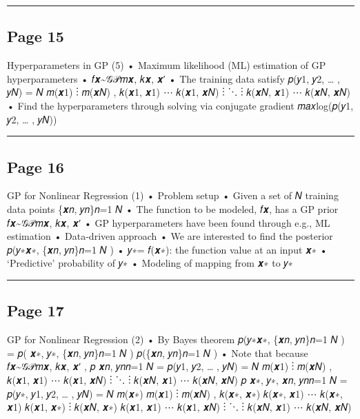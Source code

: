 \documentclass[
]{article}
\begin{document}
\begin{center}\rule{0.5\linewidth}{0.5pt}\end{center}

\subsection{Page 15}\label{page-15}

Hyperparameters in GP (5) • Maximum likelihood (ML) estimation of GP
hyperparameters • 𝑓𝒙\textasciitilde 𝒢𝒫𝑚𝒙, 𝑘𝒙, 𝒙′ • The training data
satisfy 𝑝(𝑦1, 𝑦2, \ldots{} , 𝑦𝑁) = 𝑁 𝑚(𝒙1) ⋮ 𝑚(𝒙𝑁) , 𝑘(𝒙1, 𝒙1) ⋯ 𝑘(𝒙1,
𝒙𝑁) ⋮ ⋱ ⋮ 𝑘(𝒙𝑁, 𝒙1) ⋯ 𝑘(𝒙𝑁, 𝒙𝑁) • Find the hyperparameters through
solving via conjugate gradient 𝑚𝑎𝑥log(𝑝(𝑦1, 𝑦2, \ldots{} , 𝑦𝑁))

\begin{center}\rule{0.5\linewidth}{0.5pt}\end{center}

\subsection{Page 16}\label{page-16}

GP for Nonlinear Regression (1) • Problem setup • Given a set of 𝑁
training data points \{𝒙𝑛, 𝑦𝑛\}𝑛=1 𝑁 • The function to be modeled, 𝑓𝒙,
has a GP prior 𝑓𝒙\textasciitilde 𝒢𝒫𝑚𝒙, 𝑘𝒙, 𝒙′ • GP hyperparameters have
been found through e.g., ML estimation • Data-driven approach • We are
interested to find the posterior 𝑝(𝑦∗\textbar 𝒙∗, \{𝒙𝑛, 𝑦𝑛\}𝑛=1 𝑁 ) •
𝑦∗= 𝑓(𝒙∗): the function value at an input 𝒙∗ • `Predictive' probability
of 𝑦∗ • Modeling of mapping from 𝒙∗ to 𝑦∗

\begin{center}\rule{0.5\linewidth}{0.5pt}\end{center}

\subsection{Page 17}\label{page-17}

GP for Nonlinear Regression (2) • By Bayes theorem 𝑝(𝑦∗\textbar 𝒙∗,
\{𝒙𝑛, 𝑦𝑛\}𝑛=1 𝑁 ) = 𝑝( 𝒙∗, 𝑦∗, \{𝒙𝑛, 𝑦𝑛\}𝑛=1 𝑁 ) 𝑝(\{𝒙𝑛, 𝑦𝑛\}𝑛=1 𝑁 ) •
Note that because 𝑓𝒙\textasciitilde 𝒢𝒫𝑚𝒙, 𝑘𝒙, 𝒙′ , 𝑝 𝒙𝑛, 𝑦𝑛𝑛=1 𝑁 = 𝑝(𝑦1,
𝑦2, \ldots{} , 𝑦𝑁) = 𝑁 𝑚(𝒙1) ⋮ 𝑚(𝒙𝑁) , 𝑘(𝒙1, 𝒙1) ⋯ 𝑘(𝒙1, 𝒙𝑁) ⋮ ⋱ ⋮ 𝑘(𝒙𝑁,
𝒙1) ⋯ 𝑘(𝒙𝑁, 𝒙𝑁) 𝑝 𝒙∗, 𝑦∗, 𝒙𝑛, 𝑦𝑛𝑛=1 𝑁 = 𝑝(𝑦∗, 𝑦1, 𝑦2, \ldots{} , 𝑦𝑁) = 𝑁
𝑚(𝒙∗) 𝑚(𝒙1) ⋮ 𝑚(𝒙𝑁) , 𝑘(𝒙∗, 𝒙∗) 𝑘(𝒙∗, 𝒙1) ⋯ 𝑘(𝒙∗, 𝒙1) 𝑘(𝒙1, 𝒙∗) ⋮ 𝑘(𝒙𝑁,
𝒙∗) 𝑘(𝒙1, 𝒙1) ⋯ 𝑘(𝒙1, 𝒙𝑁) ⋮ ⋱ ⋮ 𝑘(𝒙𝑁, 𝒙1) ⋯ 𝑘(𝒙𝑁, 𝒙𝑁)
\end{document}
